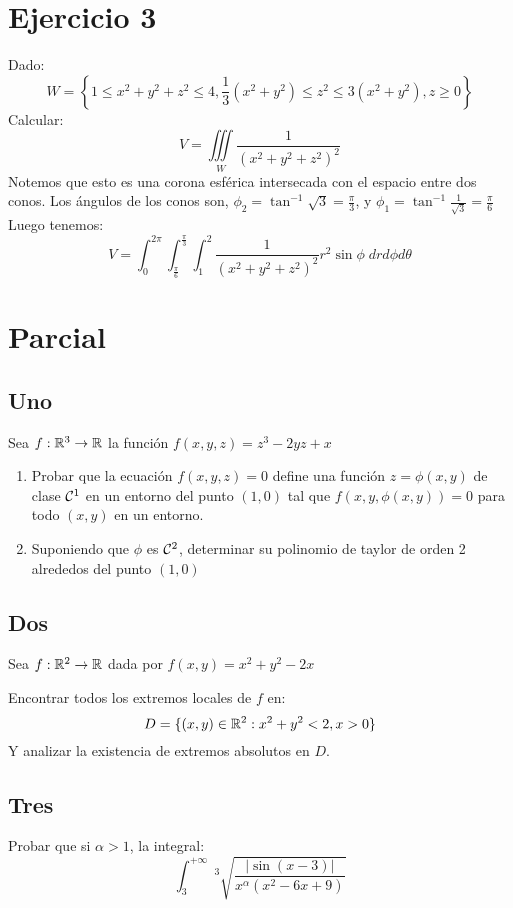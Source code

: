 \documentclass{article}
\begin{document}
\section*{Ejercicio 3}
Dado:
\[W = \left\{
        1 \leq x^2 + y^2 + z^2 \leq 4,
        \frac{1}{3}(x^2 + y^2) \leq z^2 \leq 3(x^2 + y^2),
        z \geq 0
\right\}\]
Calcular:
\[
    V = \iiint\limits_W \frac{1}{(x^2 + y^2 + z^2)^2}
\]
Notemos que esto es una corona esférica intersecada con el espacio entre dos conos.
Los ángulos de los conos son, $\phi_2 = \tan^{-1}\sqrt 3 = \frac{\pi}{3}$, y $\phi_1 = \tan^{-1}\frac{1}{\sqrt 3} = \frac{\pi}{6}$
Luego tenemos:
\[
    V = \int_0^{2\pi} \int_{\frac{\pi}{6}}^{\frac{\pi}{3}} \int_1^2 \frac{1}{(x^2 + y^2 + z^2)^2} r^2 \sin \phi \; dr d\phi d\theta
\]
\section*{Parcial}
\subsection*{Uno}
Sea $f : \mathbb{R}^3 \to \mathbb{R}$ la función $f(x,y,z) = z^3 - 2yz + x$
\begin{enumerate}
    \item Probar que la ecuación $f(x,y,z) = 0$ define una función $z = \phi(x,y)$ de clase $\mathcal{C}^1$ en un entorno del punto $(1,0)$ tal que $f(x, y, \phi(x,y)) = 0$ para todo $(x,y)$ en un entorno.
    \item Suponiendo que $\phi$ es $\mathcal{C}^2$, determinar su polinomio de taylor de orden 2 alrededos del punto $(1,0)$
\end{enumerate}
\subsection*{Dos}
Sea $f : \mathbb{R}^2 \to \mathbb{R}$ dada por $f(x,y) = x^2 + y^2 - 2x$
\begin{enumerate}
    Encontrar todos los extremos locales de $f$ en:
    \[D = \{(x,y) \in \mathbb{R}^2 : x^2 + y^2 < 2, x > 0\}\]
    Y analizar la existencia de extremos absolutos en $D$.
\end{enumerate}
\subsection*{Tres}
Probar que si $\alpha > 1$, la integral:
\[\int_3^{+\infty}\;^3\sqrt{\frac{|\sin (x - 3)|}{x^\alpha(x^2 - 6x + 9)}}\]
\end{document}

